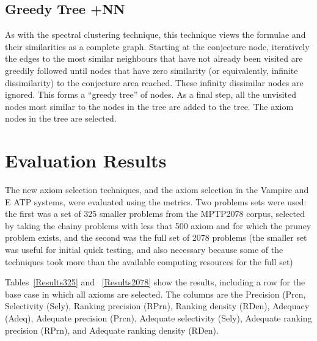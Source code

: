 \documentclass[EPiC]{easychair}
\begin{document}
\subsection{Greedy Tree +NN}
\label{Zihao}

As with the spectral clustering technique, this technique views the formulae
and their similarities as a complete graph.
Starting at the conjecture node, iteratively the edges to the most similar
neighbours that have not already been visited are greedily followed until 
nodes that have zero similarity (or equivalently, infinite dissimilarity) 
to the conjecture area reached.
These infinity dissimilar nodes are ignored.
This forms a ``greedy tree'' of nodes.
As a final step, all the unvisited nodes most similar to the nodes in the tree
are added to the tree.
The axiom nodes in the tree are selected.

\section{Evaluation Results}
\label{Results}

The new axiom selection techniques, and the axiom selection in the Vampire 
and E ATP systems, were evaluated using the metrics.
Two problems sets were used: the first was a set of 325 smaller problems
from the MPTP2078 corpus, selected by taking the chainy problems with less
that 500 axiom and for which the pruney problem exists, and the second was
the full set of 2078 problems (the smaller set was useful for initial
quick testing, and also necessary because some of the techniques took
more than the available computing resources for the full set)

Tables~\ref{Results325} and ~\ref{Results2078} show the results, including
a row for the base case in which all axioms are selected.
The columns are the 
Precision (Prcn, 
Selectivity (Sely), 
Ranking precision (RPrn), 
Ranking density (RDen), 
Adequacy (Adeq),
Adequate precision (Prcn), Adequate selectivity (Sely), Adequate
ranking precision (RPrn), and Adequate ranking density (RDen).
\end{document}
